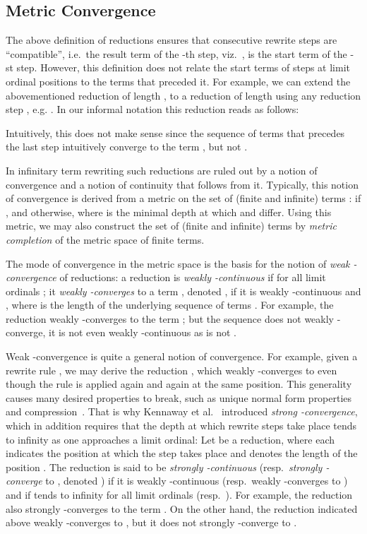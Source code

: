 \documentclass[copyright,creativecommons,UKenglish,final]{eptcs}
\theoremstyle{definition}
\theoremstyle{plain}
\begin{document}
\subsection{Metric Convergence}
\label{sec:metric-convergence}


The above definition of reductions ensures that consecutive rewrite
steps are ``compatible'', i.e.\ the result term of the -th
step, viz.\ , is the start term of the -st
step. However, this definition does not relate the start terms of
steps at limit ordinal positions to the terms that preceded it. For
example, we can extend the abovementioned reduction
 of length , to a reduction
 of length  using
any reduction step ,
e.g. . In our informal notation this reduction
 reads as follows:

Intuitively, this does not make sense since the sequence of terms that
precedes the last step intuitively converge to the term , but not .

In infinitary term rewriting such reductions are ruled out by a notion
of convergence and a notion of continuity that follows from
it. Typically, this notion of convergence is derived from a metric
 on the set of (finite and infinite) terms :  if , and  otherwise, where  is the
minimal depth at which  and  differ. Using this metric, we may
also construct the set of (finite and infinite) terms  by
\emph{metric completion} of the metric space  of finite
terms.

The mode of convergence in the metric space  is the
basis for the notion of \emph{weak -convergence} of reductions:
a reduction  is \emph{weakly -continuous} if
 for all limit ordinals
; it \emph{weakly -converges} to a term ,
denoted , if it is weakly
-continuous and ,
where  is the length of the underlying sequence of terms
. For example, the reduction
 weakly -converges to the term
; but the sequence
 does not weakly -converge, it
is not even weakly -continuous as
 is not .

Weak -convergence is quite a general notion of convergence. For
example, given a rewrite rule , we may derive the reduction
, which weakly -converges to  even though
the rule  is applied again and again at the same
position. This generality causes many desired properties to break,
such as unique normal form properties and
compression~\cite{kennaway95ic}. That is why Kennaway et
al.~\cite{kennaway95ic} introduced \emph{strong -convergence},
which in addition requires that the depth at which rewrite steps take
place tends to infinity as one approaches a limit ordinal: Let 
be a reduction, where each  indicates the position at which
the step  takes place and  denotes the
length of the position . The reduction  is said to be
\emph{strongly -continuous} (resp.\ \emph{strongly
  -converge} to , denoted ) if it is
weakly -continuous (resp.\ weakly -converges to ) and
if  tends to infinity for all limit
ordinals  (resp.\ ).  For
example, the reduction  also strongly
-converges to the term . On the other hand, the reduction  indicated
above weakly -converges to , but it does not strongly
-converge to .
\end{document}

